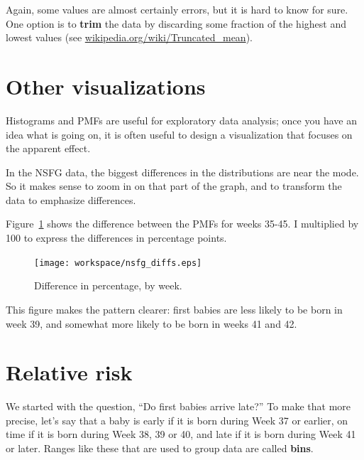 \documentclass[12pt]{book}
\begin{document}
Again, some values are almost certainly errors,
but it is hard to know for sure.  One option is to {\bf trim} the data
by discarding some fraction of the highest and lowest values (see
\url{wikipedia.org/wiki/Truncated_mean}).



\section{Other visualizations}

Histograms and PMFs are useful for exploratory data analysis;
once you have an idea what is going on, it is often useful to
design a visualization that focuses on the apparent effect.


In the NSFG data, the biggest differences in the distributions are
near the mode.  So it makes sense to zoom in on that part of the
graph, and to transform the data to emphasize differences.


Figure~\ref{nsfg_diffs} shows the difference between the PMFs for weeks
35-45.  I multiplied by 100 to express the differences in percentage
points.

\begin{figure}
\centerline{\texttt{[image: workspace/nsfg\_diffs.eps]}}
\caption{Difference in percentage, by week.}
\label{nsfg_diffs}
\end{figure}

This figure makes the pattern clearer: first babies are
less likely to be born in week 39, and somewhat more likely
to be born in weeks 41 and 42.


\section{Relative risk}
\label{relative.risk}

We started with the question, ``Do first babies arrive late?''  To
make that more precise, let's say that a baby is early if it is born
during Week 37 or earlier, on time if it is born during Week 38, 39 or
40, and late if it is born during Week 41 or later.  Ranges like these
that are used to group data are called {\bf bins}.

\end{document}
